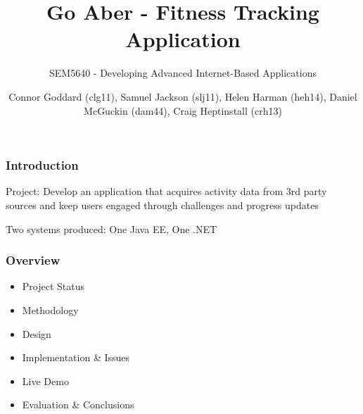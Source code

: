 \documentclass[10pt, compress]{beamer}
\title{Go Aber - Fitness Tracking Application}
\subtitle{\small{SEM5640 - Developing Advanced Internet-Based Applications}}
\author{\footnotesize{Connor Goddard (clg11), Samuel Jackson (slj11), Helen Harman (heh14), Daniel McGuckin (dam44), Craig Heptinstall (crh13)}}
\institute{Aberystwyth University}
\begin{document}
\maketitle

\begin{frame}[fragile]
  \frametitle{Introduction}
  
  \small {
  
    Project: Develop an application that acquires activity data from 3rd party sources and keep users engaged through challenges and progress updates
    
    \vspace{10pt}
    
    Two systems produced: One Java EE, One .NET
    
    }

\end{frame}

\begin{frame}[fragile]
  \frametitle{Overview}
  
  \small{
  
  	\begin{itemize}
    	\item Project Status
    	\item Methodology
    	\item Design
    	\item Implementation \& Issues
    	\item Live Demo
    	\item Evaluation \& Conclusions
    \end{itemize}
    
    }

\end{frame}

\end{document}
